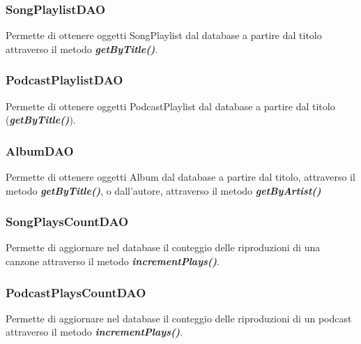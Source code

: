 \documentclass{article}
\begin{document}
  \subsubsection{SongPlaylistDAO}
  Permette di ottenere oggetti SongPlaylist dal database a partire dal titolo attraverso il metodo \textbf{\textit{getByTitle()}}.

  \subsubsection{PodcastPlaylistDAO}
  Permette di ottenere oggetti PodcastPlaylist dal database a partire dal titolo (\textbf{\textit{getByTitle()}}).

  \subsubsection{AlbumDAO}
  Permette di ottenere oggetti Album dal database a partire dal titolo, attraverso il metodo \textbf{\textit{getByTitle()}}, o dall'autore, attraverso il metodo \textbf{\textit{getByArtist()}}

  \subsubsection{SongPlaysCountDAO}
  Permette di aggiornare nel database il conteggio delle riproduzioni di una canzone attraverso il metodo \textbf{\textit{incrementPlays()}}.

  \subsubsection{PodcastPlaysCountDAO}
  Permette di aggiornare nel database il conteggio delle riproduzioni di un podcast attraverso il metodo \textbf{\textit{incrementPlays()}}.
\end{document}
